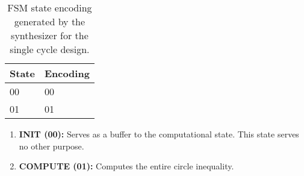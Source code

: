 \documentclass[paper=usletter, fontsize=12pt]{article}
\begin{document}
        \begin{table}[h]
            \caption{FSM state encoding generated by the synthesizer for the
            single cycle design.}
            \label{table:singlefsmcode}
            \centering
            \begin{tabular}{ m{5em}m{5em} }
                \hline
                \textbf{State}  &            \textbf{Encoding} \\
                \hline
                00              &            00 \\
                01              &            01 \\
                \hline
            \end{tabular}
        \end{table}

        \begin{enumerate}

            \item \textbf{INIT (00): } Serves as a buffer to the computational
            state. This state serves no other purpose.

            \item \textbf{COMPUTE (01): } Computes the entire circle
            inequality.

        \end{enumerate}
\end{document}
